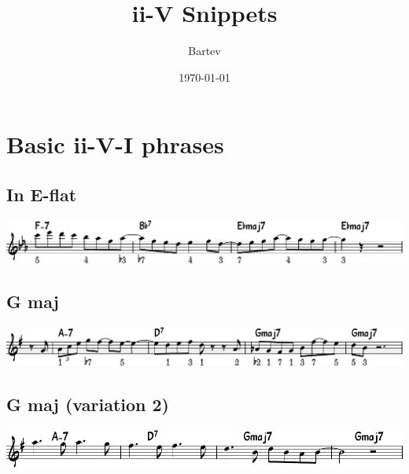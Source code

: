 \documentclass[11pt]{article}
\author{Bartev}
\date{\today}
\title{ii-V Snippets}
\let\maketitle\relax %
\begin{document}
\maketitle

\section*{Basic ii-V-I phrases}
\label{sec:org40932d7}
\subsection*{In E-flat}
\label{sec:org2b88fd7}
\begin{center}
\includegraphics[width=.9\linewidth]{e-flat.pdf}
\end{center}

\subsection*{G maj}
\label{sec:org2d51a65}
\begin{center}
\includegraphics[width=.9\linewidth]{g_maj.pdf}
\end{center}

\subsection*{G maj (variation 2)}
\label{sec:org1eb16de}
\begin{center}
\includegraphics[width=.9\linewidth]{g_maj_v2.pdf}
\end{center}
\end{document}
